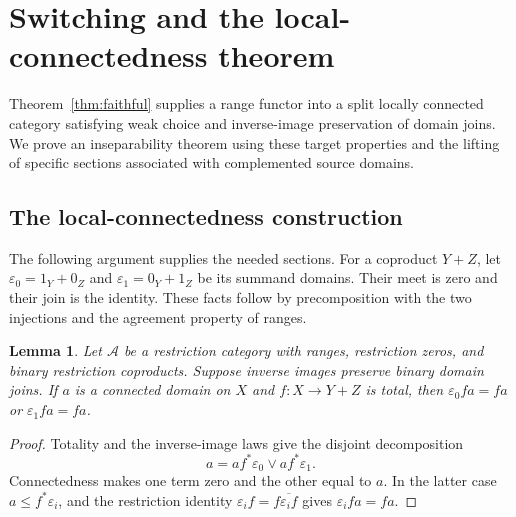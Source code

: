 \documentclass[11pt]{article}
\newtheorem{lemma}[theorem]{Lemma}
\begin{document}
\section{Switching and the local-connectedness theorem}\label{sec:lifting}

Theorem~\ref{thm:faithful} supplies a range functor into a split locally
connected category satisfying weak choice and inverse-image preservation
of domain joins. We prove an inseparability theorem using these target
properties and the lifting of specific sections associated with
complemented source domains.

\subsection{The local-connectedness construction}

The following argument supplies the needed sections.
For a coproduct $Y+Z$, let
$\varepsilon_0=1_Y+0_Z$ and $\varepsilon_1=0_Y+1_Z$ be its summand
domains. Their meet is zero and their join is the identity. These facts
follow by precomposition with the two injections and the agreement
property of ranges.

\begin{lemma}\label{lem:connected-alternative}
Let $\mathcal A$ be a restriction category with ranges, restriction zeros,
and binary restriction coproducts. Suppose inverse images preserve binary
domain joins. If $a$ is a connected domain on $X$ and
$f:X\to Y+Z$ is total, then
$\varepsilon_0fa=fa$ or $\varepsilon_1fa=fa$.
\end{lemma}
\begin{proof}
Totality and the inverse-image laws give the disjoint decomposition
\[
 a=af^*\varepsilon_0\vee af^*\varepsilon_1.
\]
Connectedness makes one term zero and the other equal to $a$. In the
latter case $a\le f^*\varepsilon_i$, and the restriction identity
$\varepsilon_i f=f\overline{\varepsilon_i f}$ gives
$\varepsilon_i fa=fa$.
\end{proof}
\end{document}
